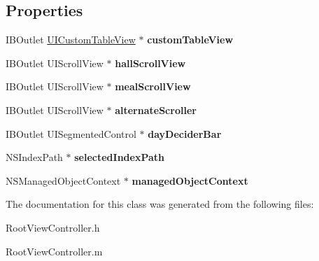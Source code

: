 \subsection*{Properties}
\begin{DoxyCompactItemize}
\item 
\hypertarget{interface_root_view_controller_a6aa17133892fb2b3543b00e1f201d52b}{
IBOutlet \hyperlink{interface_u_i_custom_table_view}{UICustomTableView} $\ast$ {\bfseries customTableView}}
\label{interface_root_view_controller_a6aa17133892fb2b3543b00e1f201d52b}

\item 
\hypertarget{interface_root_view_controller_a43c732fee633163ed5005a46ada8d2c9}{
IBOutlet UIScrollView $\ast$ {\bfseries hallScrollView}}
\label{interface_root_view_controller_a43c732fee633163ed5005a46ada8d2c9}

\item 
\hypertarget{interface_root_view_controller_ab48dca9f706c0f6f91b70eb8e4f4d186}{
IBOutlet UIScrollView $\ast$ {\bfseries mealScrollView}}
\label{interface_root_view_controller_ab48dca9f706c0f6f91b70eb8e4f4d186}

\item 
\hypertarget{interface_root_view_controller_a1a26f8ad7fc18aaba80b927dea11b105}{
IBOutlet UIScrollView $\ast$ {\bfseries alternateScroller}}
\label{interface_root_view_controller_a1a26f8ad7fc18aaba80b927dea11b105}

\item 
\hypertarget{interface_root_view_controller_a3f9b09bb78c5ce497a53224c7f02f322}{
IBOutlet UISegmentedControl $\ast$ {\bfseries dayDeciderBar}}
\label{interface_root_view_controller_a3f9b09bb78c5ce497a53224c7f02f322}

\item 
\hypertarget{interface_root_view_controller_a73b684b4a871a8cd86385c068b0521b3}{
NSIndexPath $\ast$ {\bfseries selectedIndexPath}}
\label{interface_root_view_controller_a73b684b4a871a8cd86385c068b0521b3}

\item 
\hypertarget{interface_root_view_controller_a32c8642f778ad7591a53285a475ff9cb}{
NSManagedObjectContext $\ast$ {\bfseries managedObjectContext}}
\label{interface_root_view_controller_a32c8642f778ad7591a53285a475ff9cb}

\end{DoxyCompactItemize}


The documentation for this class was generated from the following files:\begin{DoxyCompactItemize}
\item 
RootViewController.h\item 
RootViewController.m\end{DoxyCompactItemize}
